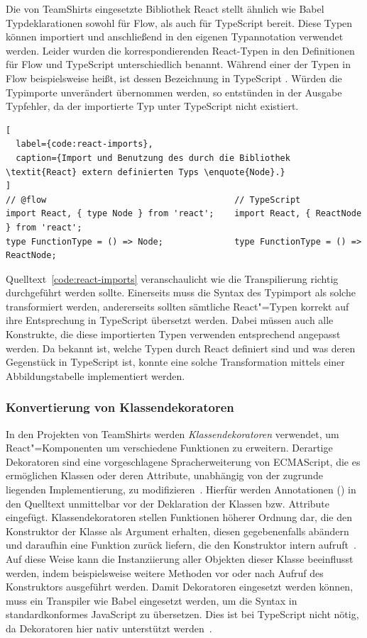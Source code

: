 Die von TeamShirts eingesetzte Bibliothek React stellt ähnlich wie Babel Typdeklarationen sowohl für Flow, als auch für TypeScript bereit. Diese Typen können importiert und anschließend in den eigenen Typannotation verwendet werden. Leider wurden die korrespondierenden React-Typen in den Definitionen für Flow und TypeScript unterschiedlich benannt. Während einer der Typen in Flow beispielsweise  heißt, ist dessen Bezeichnung in TypeScript . Würden die Typimporte unverändert übernommen werden, so entstünden in der Ausgabe Typfehler, da der importierte Typ unter TypeScript nicht existiert.

\begin{lstlisting}[
  label={code:react-imports},
  caption={Import und Benutzung des durch die Bibliothek \textit{React} extern definierten Typs \enquote{Node}.}
]
// @flow                                     // TypeScript
import React, { type Node } from 'react';    import React, { ReactNode } from 'react';
type FunctionType = () => Node;              type FunctionType = () => ReactNode;
\end{lstlisting}

Quelltext~\ref{code:react-imports} veranschaulicht wie die Transpilierung richtig durchgeführt werden sollte. Einerseits muss die Syntax des Typimport als solche transformiert werden, andererseits sollten sämtliche React"=Typen korrekt auf ihre Entsprechung in TypeScript übersetzt werden. Dabei müssen auch alle Konstrukte, die diese importierten Typen verwenden entsprechend angepasst werden. Da bekannt ist, welche Typen durch React definiert sind und was deren Gegenstück in TypeScript ist, konnte eine solche Transformation mittels einer Abbildungstabelle implementiert werden.

\subsubsection{Konvertierung von Klassendekoratoren}
\label{sec:class-decorators}

In den Projekten von TeamShirts werden \textit{Klassendekoratoren} verwendet, um React"=Komponenten um verschiedene Funktionen zu erweitern. Derartige Dekoratoren sind eine vorgeschlagene Spracherweiterung von ECMAScript, die es ermöglichen Klassen oder deren Attribute, unabhängig von der zugrunde liegenden Implementierung, zu modifizieren~\autocite{ES_PROPOSAL:DECORATORS}. Hierfür werden Annotationen () in den Quelltext unmittelbar vor der Deklaration der Klassen bzw. Attribute eingefügt. Klassendekoratoren stellen Funktionen höherer Ordnung dar, die den Konstruktor der Klasse als Argument erhalten, diesen gegebenenfalls abändern und daraufhin eine Funktion zurück liefern, die den Konstruktor intern aufruft~\autocite{ES_PROPOSAL:DECORATORS}. Auf diese Weise kann die Instanziierung aller Objekten dieser Klasse beeinflusst werden, indem beispielsweise weitere Methoden vor oder nach Aufruf des Konstruktors ausgeführt werden. Damit Dekoratoren eingesetzt werden können, muss ein Transpiler wie Babel eingesetzt werden, um die Syntax in standardkonformes JavaScript zu übersetzen. Dies ist bei TypeScript nicht nötig, da Dekoratoren hier nativ unterstützt werden~\autocite{TS:HANDBOOK:DECORATORS}.

